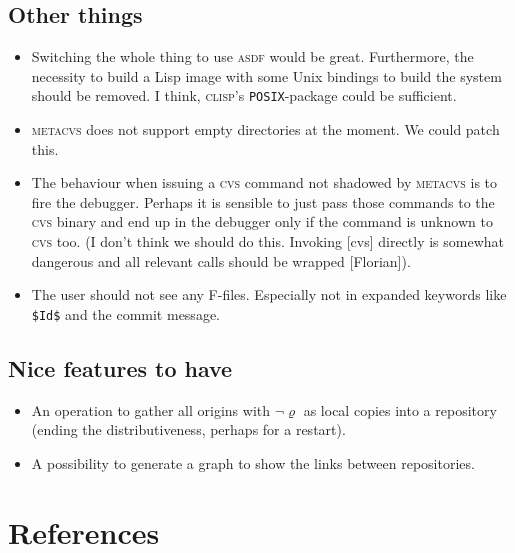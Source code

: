 \documentclass[fleqn, 10pt, a4paper]{article}
\begin{document}
\subsection{Other things}
\begin{itemize}
\item Switching the whole thing to use \textsc{asdf} would be great.
Furthermore, the necessity to build a Lisp image with some Unix bindings
to build the system should be removed. I think, \textsc{clisp}'s
\texttt{POSIX}-package could be sufficient.
\item \textsc{metacvs} does not support empty directories at the moment.
We could patch this.
\item The behaviour when issuing a \textsc{cvs} command not shadowed by
\textsc{metacvs} is to fire the debugger. Perhaps it is sensible to
just pass those commands to the \textsc{cvs} binary and end up in the debugger
only if the command is unknown to \textsc{cvs} too.
(I don't think we should do this. Invoking \textsc[cvs] directly
is somewhat dangerous and all relevant calls should be wrapped [Florian]).
\item The user should not see any F-files. Especially not in
expanded keywords like \texttt{\$Id\$} and the commit message.
\end{itemize}

\subsection{Nice features to have}

\begin{itemize}
\item An operation to gather all origins with $\neg \varrho$ as
local copies into a repository (ending the distributiveness, perhaps
for a restart).
\item A possibility to generate a graph to show the links between
repositories.
\end{itemize}

\section{References}
\end{document}
